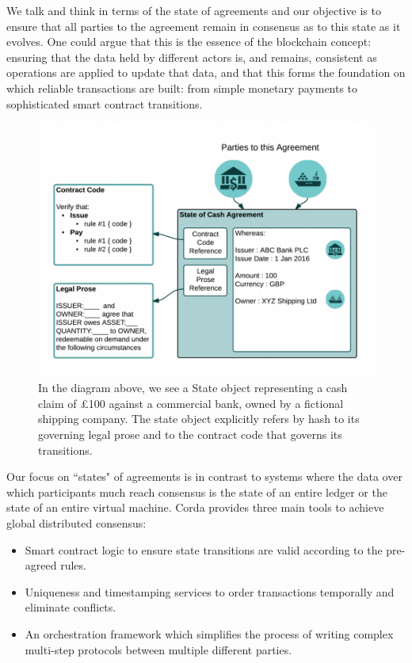\documentclass{article}
\begin{document}
We talk and think in terms of the state of agreements and our objective is to ensure that all parties to the agreement remain in consensus as to this state as it evolves. One could argue that this is the essence of the blockchain concept: ensuring that the data held by different actors is, and remains, consistent as operations are applied to update that data, and that this forms the foundation on which reliable transactions are built: from simple monetary payments to sophisticated smart contract transitions.

\begin{figure}[H]
\includegraphics[scale = .4, center]{partiesto}
\caption{In the diagram above, we see a State object representing a cash claim of \pounds100 against a commercial bank, owned by a fictional shipping company.  The state object explicitly refers by hash to its governing legal prose and to the contract code that governs its transitions.}
\end{figure}

Our focus on ``states" of agreements is in contrast to systems where the data over which participants much reach consensus is the state of an entire ledger or the state of an entire virtual machine. Corda provides three main tools to achieve global distributed consensus:
\begin{itemize}
    \item Smart contract logic to ensure state transitions are valid according to the pre-agreed rules.
    \item Uniqueness and timestamping services to order transactions temporally and eliminate conflicts.
    \item An orchestration framework which simplifies the process of writing complex multi-step protocols between multiple different parties.
    \end{itemize}
    
\end{document}
